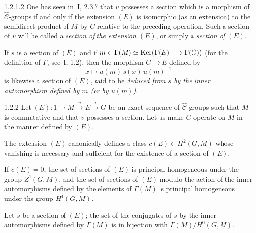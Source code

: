 \begin{definition}{1.2.1.2}\label{III.1.2.1.2}
One has seen in~I, 2.3.7 that \(v\) possesses a section which is a morphism
of \(\widehat{\mathcal{C}}\)-groups if and only if the extension \((E)\) is
isomorphic (\og as an extension\fg) to the semidirect product of \(M\) by
\(G\) relative to the preceding operation. Such a section of \(v\) will be
called a \emph{section of the extension \((E)\)}, or simply a
\emph{section of \((E)\)}.

If \(s\) is a section of \((E)\) and if
\(m\in\Gamma(M)\simeq\operatorname{Ker}(\Gamma(E)\longrightarrow\Gamma(G))\) (for the definition of
\(\Gamma\), see~I, 1.2), then the morphism \(G\to E\) defined
by%
{\renewcommand{\thefootnote}{(41)}}
\[
x\mapsto u(m)\,s(x)\,u(m)^{-1}
\]
is likewise a section of \((E)\), said to be \emph{deduced from \(s\) by the
inner automorphism defined by \(m\) (or by \(u(m)\))}.
\end{definition}

\begin{lemma}{1.2.2}\label{III.1.2.2}
Let \((E)\colon 1\longrightarrow M\xrightarrow{u}E\xrightarrow{v}G\) be an
exact sequence of \(\widehat{\mathcal{C}}\)-groups such that \(M\) is
commutative and that \(v\) possesses a section. Let us make \(G\) operate on
\(M\) in the manner defined by \((E)\).
\begin{enumeratei}
\item The extension \((E)\) canonically defines a class
\(c(E)\in H^{2}(G, M)\) whose vanishing is necessary and sufficient for the
existence of a section of \((E)\).
\item If \(c(E)=0\), the set of sections of \((E)\) is principal homogeneous
under the group \(Z^{1}(G, M)\), and the set of sections of \((E)\) modulo
the action of the inner automorphisms defined by the elements of
\(\Gamma(M)\) is principal homogeneous under the group \(H^{1}(G, M)\).
\item {\renewcommand{\thefootnote}{(42)}}%
Let \(s\) be a section of \((E)\); the set of the conjugates of \(s\) by the
inner automorphisms defined by \(\Gamma(M)\) is in bijection with
\(\Gamma(M)/H^{0}(G, M)\).
\end{enumeratei}
\end{lemma}

